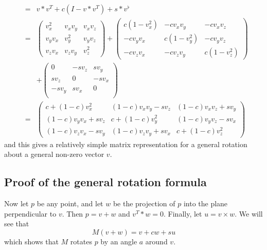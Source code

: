 \documentclass{book}
\begin{document}
\begin{eqnarray*}
&=& v*v^T + c(I-v*v^T) + s*v^\flat \\
&=&
\left (
\begin{array}{ccc}
v_x^2 & v_xv_y & v_xv_z \\
v_yv_x & v_y^2 & v_yv_z \\
v_zv_x & v_zv_y & v_z^2
\end{array}
\right )
+
\left (
\begin{array}{ccc}
c(1-v_x^2) & -cv_xv_y & -cv_xv_z \\
-cv_yv_x & c(1-v_y^2) & -cv_yv_z \\
-cv_zv_x & -cv_zv_y & c(1-v_z^2)
\end{array}
\right )
\\
&&
+
\left (
\begin{array}{ccc}
0& -sv_z & sv_y \\
sv_z& 0 & -sv_x \\
-sv_y & sv_x & 0 \\
\end{array}
\right ) \\
&=&
\left (
\begin{array}{ccc}
c+(1-c)v_x^2 & (1-c)v_xv_y - sv_z & (1-c)v_xv_z + s v_y \\
(1-c)v_yv_x+sv_z & c+(1-c)v_y^2 & (1-c)v_yv_z - sv_x \\
(1-c)v_zv_x  -sv_y& (1-c)v_zv_y +sv_x & c + (1-c)v_z^2
\end{array}
\right )
\end{eqnarray*}
and this gives a relatively simple matrix representation for a general rotation about a
general non-zero vector $v$.

\subsection{Proof of the general rotation formula}
Now let $p$ be any point, and let $w$ be the projection of $p$ into the plane perpendicular to $v$.
Then $p=v+w$ and $v^T*w=0$. Finally, let $u = v\times w$.
We will see that
\[
M(v+w) = v + cw + su
\]
which shows that $M$ rotates $p$ by an angle $a$ around $v$.
\end{document}
